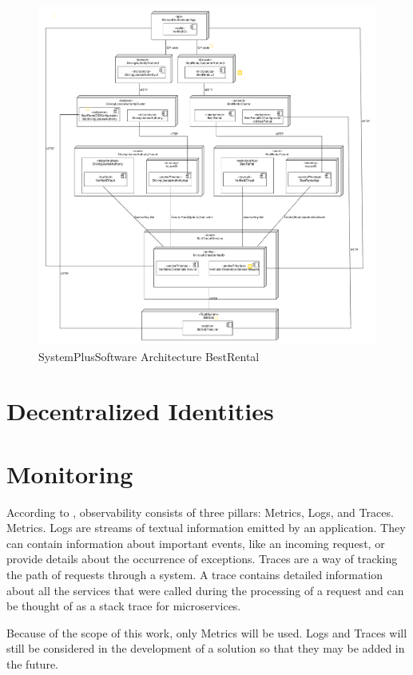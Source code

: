 \begin{figure}
	\centering
	\includegraphics[width=\textwidth]{pdfs/sps_achitecture_bestrental.pdf}
	\caption{SystemPlusSoftware Architecture BestRental}
	\label{fig:sps_architecture_bestrental}
\end{figure}

\section{Decentralized Identities}

\section{Monitoring}

According to \cite{9837035}, observability consists of three pillars: Metrics, Logs, and Traces.
Metrics.
Logs are streams of textual information emitted by an application. They can contain information about important
events, like an incoming request, or provide details about the occurrence of exceptions.
Traces are a way of tracking the path of requests through a system. A trace contains detailed information
about all the services that were called during the processing of a request and can be thought of
as a stack trace for microservices.

Because of the scope of this work, only Metrics will be used. Logs and Traces will still be considered
in the development of a solution so that they may be added in the future.

